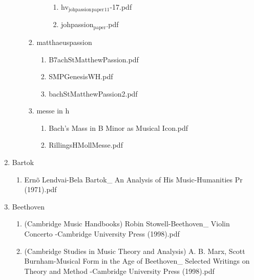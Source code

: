 \documentclass[11pt]{article}
\begin{document}
\begin{enumerate}
\begin{enumerate}
\begin{enumerate}
\begin{enumerate}
\begin{enumerate}
\item hv$_{\text{johpassion}}$$_{\text{paper}}$$_{\text{11}}$-17.pdf
\label{sec-1-1-1-1-31-7-2-10-6-6-2}

\item johpassion$_{\text{paper}}$.pdf
\label{sec-1-1-1-1-31-7-2-10-6-6-3}
\end{enumerate}
\end{enumerate}

\item matthaeuspassion
\label{sec-1-1-1-1-31-7-2-10-7}
\begin{enumerate}
\item B7achStMatthewPassion.pdf
\label{sec-1-1-1-1-31-7-2-10-7-1}

\item SMPGenesisWH.pdf
\label{sec-1-1-1-1-31-7-2-10-7-2}

\item bachStMatthewPassion2.pdf
\label{sec-1-1-1-1-31-7-2-10-7-3}
\end{enumerate}

\item messe in h
\label{sec-1-1-1-1-31-7-2-10-8}
\begin{enumerate}
\item Bach's Mass in B Minor as Musical Icon.pdf
\label{sec-1-1-1-1-31-7-2-10-8-1}

\item RillingsHMollMesse.pdf
\label{sec-1-1-1-1-31-7-2-10-8-2}
\end{enumerate}
\end{enumerate}
\end{enumerate}

\item Bartok
\label{sec-1-1-1-1-31-7-3}
\begin{enumerate}
\item Ernõ Lendvai-Bela Bartok\_ An Analysis of His Music-Humanities Pr (1971).pdf
\label{sec-1-1-1-1-31-7-3-1}
\end{enumerate}

\item Beethoven
\label{sec-1-1-1-1-31-7-4}
\begin{enumerate}
\item (Cambridge Music Handbooks) Robin Stowell-Beethoven\_ Violin Concerto -Cambridge University Press (1998).pdf
\label{sec-1-1-1-1-31-7-4-1}

\item (Cambridge Studies in Music Theory and Analysis) A. B. Marx, Scott Burnham-Musical Form in the Age of Beethoven\_ Selected Writings on Theory and Method -Cambridge University Press (1998).pdf
\label{sec-1-1-1-1-31-7-4-2}


\end{enumerate}
\end{enumerate}
\end{document}
